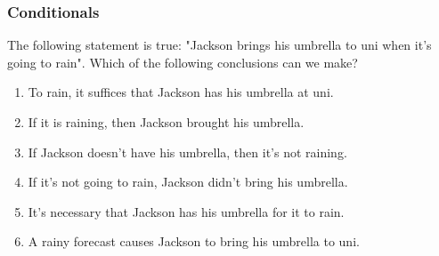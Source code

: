 \documentclass{beamer}
\begin{document}
\begin{frame}
\frametitle{Conditionals}

The following statement is true: "Jackson brings his umbrella to uni when it's
going to rain". \pause Which of the following conclusions can we make?

\begin{enumerate}
\item To rain, it suffices that Jackson has his umbrella at uni.
\item If it is raining, then Jackson brought his umbrella.
\item If Jackson doesn't have his umbrella, then it's not raining.
\item If it's not going to rain, Jackson didn't bring his umbrella.
\item It's necessary that Jackson has his umbrella for it to rain.
\item A rainy forecast causes Jackson to bring his umbrella to uni.
\end{enumerate}

\end{frame}
\end{document}
